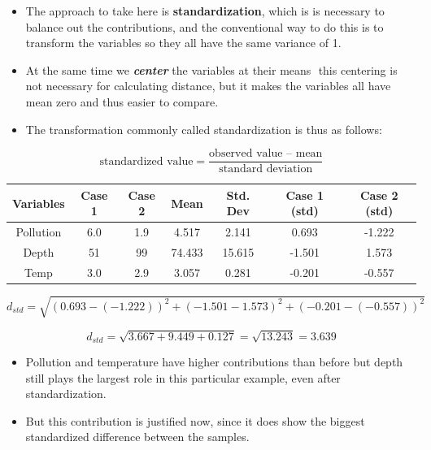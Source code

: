 \documentclass[12pt]{article}
\begin{document}
\begin{itemize}
\item The approach to take here is \textbf{standardization}, which is is necessary to balance out the contributions, and the
conventional way to do this is to transform the variables so they all have the same variance
of 1. 
\item At the same time we \textbf{\textit{center}} the variables at their means  this centering is not
necessary for calculating distance, but it makes the variables all have mean zero and thus
easier to compare. 

\item  The transformation commonly called standardization is thus as follows:
\end{itemize}


\[\mbox{standardized value} = \frac{\mbox{observed value  mean}}{ \mbox{standard deviation}}\]
\begin{center}
	\begin{tabular}{|c|c|c|c|c|c|c|}
		\hline
		Variables & Case 1 & Case 2 & Mean & Std. Dev & Case 1 (std) & Case 2 (std) \\ \hline
		Pollution & 6.0 & 1.9 & 4.517	&	2.141	&	0.693	&	-1.222	\\
		Depth & 51 & 99 & 74.433	&	15.615	&	-1.501	&	1.573	\\
		Temp & 3.0 & 2.9 & 3.057	&	0.281	&	-0.201	&	-0.557	\\
		\hline
	\end{tabular}
\end{center}

\[ d_{std} =  \sqrt{(0.693 - (- 1.222))^2 + (-1.501-1.573)^2 + (-0.201-(-0.557))^2} \]

\[ d_{std} = \sqrt{3.667 + 9.449 + 0.127} = \sqrt{13.243} = 3.639 \]
\newpage
\begin{itemize}
\item Pollution and temperature have higher contributions than before but depth still plays the
largest role in this particular example, even after standardization. 
\item But this contribution is
justified now, since it does show the biggest standardized difference between the samples. 

\end{itemize}
\newpage
\end{document}
